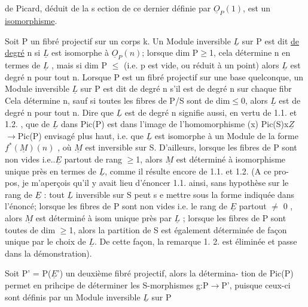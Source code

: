de Picard, déduit de la s ection de ce dernier définie par $\underline{O}_P(1)$, est un
\uline{isomorphisme}.

Soit P un fibré projectif sur un corps k. Un Module inversible
$\underline{L}$ sur P est dit \uline{de degré} n si $\underline{L}$ est isomorphe à $\underline{O}_P(n)$; lorsque
dim P$\geq$1, cela détermine n en termes de $\underline{L}$ , mais si dim P $\leq$ 
(i.e. p est vide, ou réduit à un point) alors $\underline{L}$ est degré n pour tout n.
Lorsque P est un fibré projectif sur une base quelconque, un Module
inversible $\underline{L}$ sur P est dit de degré n s'il est de degré n sur chaque fibr
Cela détermine n, sauf si toutes les fibres de P/S sont de dim$\leq$0, alors
$\underline{L}$ est de degré n pour tout n. Dire que $\underline{L}$ est de degré n signifie aussi,
en vertu de 1.1. et 1.2. , que   de $\underline{L}$ dans Pic(P) est dans
l'image de  l'homomorphisme (x) Pic(S)x$\underline{Z}$ $\longrightarrow$Pic(P) envisagé plus haut,
i.e. que $\underline{L}$ est isomorphe à un Module de la forme $f^*(\underline{M})(n)$ , où $\underline{M}$ est
inversible sur S. D'ailleurs, lorsque les fibres de P sont non vides
i.e..$\underline{E}$ partout de rang $\geq$1, alors $\underline{M}$ est déterminé à isomorphisme unique
\margin{\textbar}près en termes de $\underline{L}$, comme il résulte encore de 1.1. et 1.2. (A ce pro-%
pos, je m'aperçois qu'il y avait lieu d'énoncer 1.1. ainsi, sans hypothèse
sur le rang de $\underline{E}$ : tout $\underline{L}$ inversible sur S peut s e mettre sous la forme
indiquée dans l'énoncé; lorsque les fibres de P sont non vides i.e. le
rang de $\underline{E}$ partout $\neq$ 0 , alors $\underline{M}$ est déterminé à isom unique près par
$\underline{L}$ ; lorsque les fibres de P sont toutes de dim $\geq$1,  alors la partition
de S est également déterminée de façon unique par le choix de $\underline{L}$. De cette
façon, la remarque 1. 2. est éliminée et passe dans la démonstration).

Soit P' = P($\underline{E}$') un deuxième fibré projectif, alors la détermina-%
tion de Pic(P) permet en prihcipe de déterminer les S-morphismes
g:P$\to$P', puisque ceux-ci sont définis par un Module inversible $\underline{L}$  sur P

